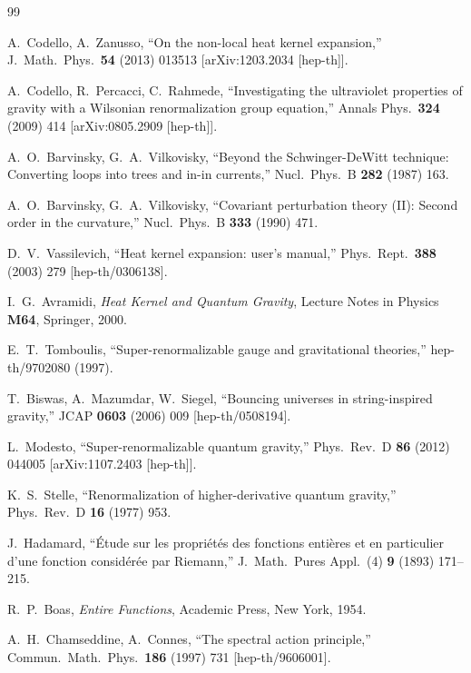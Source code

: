 \documentclass[12pt,a4paper]{article}
\theoremstyle{definition}
\theoremstyle{remark}
\begin{document}
\begin{thebibliography}{99}

  A.~Codello, A.~Zanusso,
  ``On the non-local heat kernel expansion,''
  J.\ Math.\ Phys.\ \textbf{54} (2013) 013513
  [arXiv:1203.2034 [hep-th]].

  A.~Codello, R.~Percacci, C.~Rahmede,
  ``Investigating the ultraviolet properties of gravity with a
  Wilsonian renormalization group equation,''
  Annals Phys.\ \textbf{324} (2009) 414
  [arXiv:0805.2909 [hep-th]].

  A.~O.~Barvinsky, G.~A.~Vilkovisky,
  ``Beyond the Schwinger-DeWitt technique: Converting loops into
  trees and in-in currents,''
  Nucl.\ Phys.\ B \textbf{282} (1987) 163.

  A.~O.~Barvinsky, G.~A.~Vilkovisky,
  ``Covariant perturbation theory (II): Second order in the
  curvature,''
  Nucl.\ Phys.\ B \textbf{333} (1990) 471.

  D.~V.~Vassilevich,
  ``Heat kernel expansion: user's manual,''
  Phys.\ Rept.\ \textbf{388} (2003) 279
  [hep-th/0306138].

  I.~G.~Avramidi,
  \emph{Heat Kernel and Quantum Gravity},
  Lecture Notes in Physics \textbf{M64},
  Springer, 2000.

  E.~T.~Tomboulis,
  ``Super-renormalizable gauge and gravitational theories,''
  hep-th/9702080 (1997).

  T.~Biswas, A.~Mazumdar, W.~Siegel,
  ``Bouncing universes in string-inspired gravity,''
  JCAP \textbf{0603} (2006) 009
  [hep-th/0508194].

  L.~Modesto,
  ``Super-renormalizable quantum gravity,''
  Phys.\ Rev.\ D \textbf{86} (2012) 044005
  [arXiv:1107.2403 [hep-th]].

  K.~S.~Stelle,
  ``Renormalization of higher-derivative quantum gravity,''
  Phys.\ Rev.\ D \textbf{16} (1977) 953.

  J.~Hadamard,
  ``\'{E}tude sur les propri\'{e}t\'{e}s des fonctions enti\`{e}res
  et en particulier d'une fonction consid\'{e}r\'{e}e par Riemann,''
  J.\ Math.\ Pures Appl.\ (4) \textbf{9} (1893) 171--215.

  R.~P.~Boas,
  \emph{Entire Functions},
  Academic Press, New York, 1954.

  A.~H.~Chamseddine, A.~Connes,
  ``The spectral action principle,''
  Commun.\ Math.\ Phys.\ \textbf{186} (1997) 731
  [hep-th/9606001].

\end{thebibliography}
\end{document}
